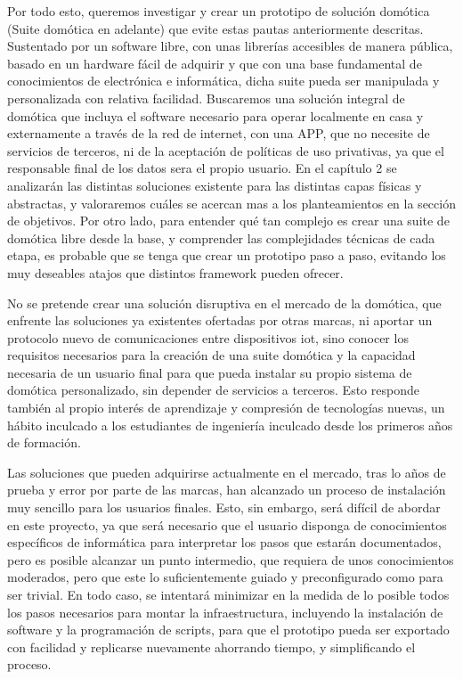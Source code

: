 \vspace{1cm}

Por todo esto, queremos investigar y crear un prototipo de solución domótica (Suite domótica en adelante) que evite estas pautas anteriormente descritas. Sustentado por un software libre, con unas librerías accesibles de manera pública, basado en un hardware fácil de adquirir y que con una base fundamental de conocimientos de electrónica e informática, dicha suite pueda ser manipulada y personalizada con relativa facilidad. Buscaremos una solución integral de domótica que incluya el software necesario para operar localmente en casa y externamente a través de la red de internet, con una APP, que no necesite de servicios de terceros, ni de la aceptación de políticas de uso privativas, ya que el responsable final de los datos sera el propio usuario. En el capítulo 2 se analizarán las distintas soluciones existente para las distintas capas físicas y abstractas, y valoraremos cuáles se acercan mas a los planteamientos en la  sección de objetivos. Por otro lado, para entender qué tan complejo es crear una suite de domótica libre desde la base, y comprender las complejidades técnicas de cada etapa, es probable que se tenga que crear un prototipo paso a paso, evitando los muy deseables atajos que distintos \gls{framework} pueden ofrecer.

\vspace{1cm}

No se pretende crear una solución disruptiva en el mercado de la domótica, que enfrente las soluciones ya existentes ofertadas por otras marcas, ni aportar un protocolo nuevo de comunicaciones entre dispositivos \gls{iot}, sino conocer los requisitos necesarios para la creación de una suite domótica y la capacidad necesaria de un usuario final para que pueda instalar su propio sistema de domótica personalizado, sin depender de servicios a terceros. Esto responde también al propio interés de aprendizaje y compresión de tecnologías nuevas, un hábito inculcado a los estudiantes de ingeniería inculcado desde los primeros años de formación.

\vspace{1cm}

Las soluciones que pueden adquirirse actualmente en el mercado, tras lo años de prueba y error por parte de las marcas, han alcanzado un proceso de instalación muy sencillo para los usuarios finales. Esto, sin embargo, será difícil de abordar en este proyecto, ya que será necesario que el usuario disponga de conocimientos específicos de informática para interpretar los pasos que estarán documentados, pero es posible alcanzar un punto intermedio, que requiera de unos conocimientos moderados, pero que este lo suficientemente guiado y preconfigurado como para ser trivial. En todo caso, se intentará minimizar en la medida de lo posible todos los pasos necesarios para montar la infraestructura, incluyendo la instalación de software y la programación de scripts, para que el prototipo pueda ser exportado con facilidad y replicarse nuevamente ahorrando tiempo, y simplificando el proceso.

